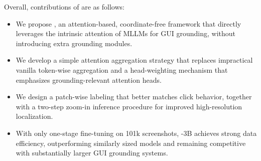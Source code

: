 Overall, contributions of \method{} are as follows:
\begin{itemize}
    \item We propose \method{}, an attention-based, coordinate-free framework that directly leverages the intrinsic attention of MLLMs for GUI grounding, without introducing extra grounding modules.
    \item We develop a simple attention aggregation strategy that replaces impractical vanilla token-wise aggregation and a head-weighting mechanism that emphasizes grounding-relevant attention heads.
    \item We design a patch-wise labeling that better matches click behavior, together with a two-step zoom-in inference procedure for improved high-resolution localization.
    \item With only one-stage fine-tuning on 101k screenshots, \method{}-3B achieves strong data efficiency, outperforming similarly sized models and remaining competitive with substantially larger GUI grounding systems.
\end{itemize}